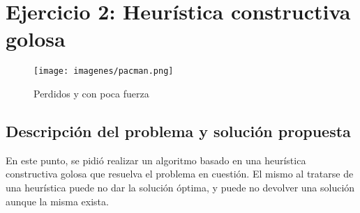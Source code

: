 \section{Ejercicio 2: Heurística constructiva golosa}

  \begin{figure}[ht]
    \begin{center}
      \texttt{[image: imagenes/pacman.png]}
      \caption{Perdidos y con poca fuerza}
    \end{center}
  \end{figure}

    \subsection{Descripción del problema y solución propuesta}
        En este punto, se pidió realizar un algoritmo basado en una heurística constructiva golosa que resuelva el problema en cuestión. El mismo al tratarse de una heurística puede no dar la solución óptima, y puede no devolver una solución aunque la misma exista.

